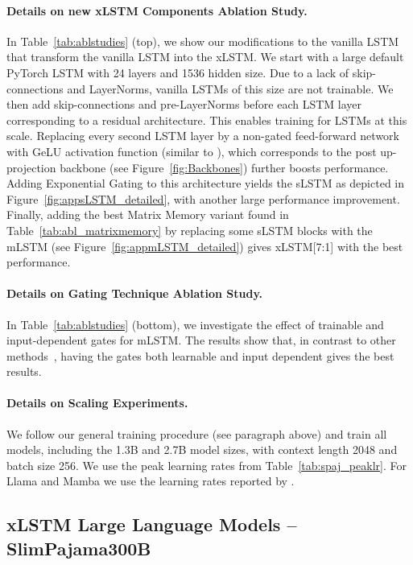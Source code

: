\documentclass[dvipsnames]{article}
\begin{document}
\begin{appendix}
\paragraph{Details on new xLSTM Components Ablation Study.} In Table~\ref{tab:ablstudies} (top), we show our modifications to the vanilla LSTM that transform the vanilla LSTM into the xLSTM.
We start with a large default PyTorch LSTM with 24 layers and 1536 hidden size. Due to a lack of skip-connections and LayerNorms, vanilla LSTMs of this size are not trainable.
We then add skip-connections and pre-LayerNorms before each LSTM layer corresponding to a residual architecture.
This enables training for LSTMs at this scale.
Replacing every second LSTM layer by a non-gated feed-forward network with GeLU activation function (similar to \citeauthor{Vaswani:17}), which corresponds to the post up-projection backbone (see Figure~\ref{fig:Backbones}) further boosts performance.
Adding Exponential Gating to this architecture yields the sLSTM as depicted in Figure~\ref{fig:appsLSTM_detailed}, with another large performance improvement.
Finally, adding the best Matrix Memory variant found in Table~\ref{tab:abl_matrixmemory} by replacing some sLSTM blocks with the mLSTM (see Figure~\ref{fig:appmLSTM_detailed}) gives xLSTM[7:1] with the best performance.
\paragraph{Details on Gating Technique Ablation Study.} In Table~\ref{tab:ablstudies} (bottom), we investigate the effect of trainable and input-dependent gates for mLSTM. The results show that, in contrast to other methods~\citep{Katharopoulos:20, Sun:23arxiv,Qin:23, Katsch:23, Yang:23arxiv, Qin:24arxiv, Peng:24arxivshort}, having the gates both learnable and input dependent gives the best results.
\paragraph{Details on Scaling Experiments.}
We follow our general training procedure (see paragraph above)
and train all models, including the 1.3B and 2.7B model sizes,
with context length 2048 and batch size 256.
We use the peak learning rates from Table~\ref{tab:spaj_peaklr}.
For Llama and Mamba we use the learning rates reported by \citet{Gu:24arxiv}.
\subsection{xLSTM Large Language Models -- SlimPajama300B}
\label{sec:appExpLanguage}

\end{appendix}
\end{document}
